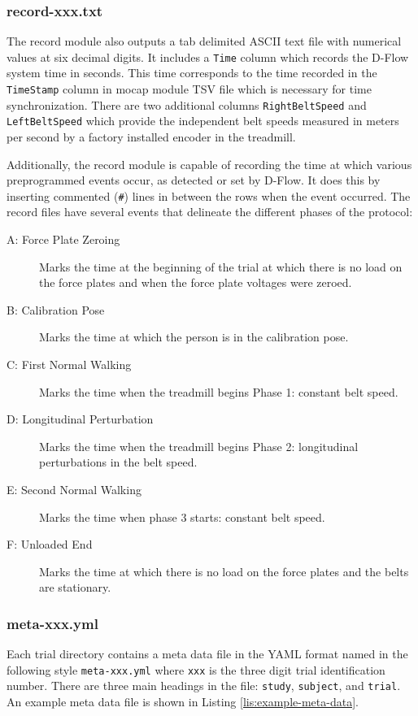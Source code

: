 \documentclass[fleqn,12pt]{wlpeerj}
\begin{document}
\subsubsection*{record-xxx.txt}
%
The record module also outputs a tab delimited ASCII text file with numerical
values at six decimal digits. It includes a \verb+Time+ column which records
the D-Flow system time in seconds. This time corresponds to the time recorded
in the \verb+TimeStamp+ column in mocap module TSV file which is necessary for
time synchronization. There are two additional columns \verb+RightBeltSpeed+
and \verb+LeftBeltSpeed+ which provide the independent belt speeds measured in
meters per second by a factory installed encoder in the treadmill.

Additionally, the record module is capable of recording the time at which
various preprogrammed events occur, as detected or set by D-Flow. It does this
by inserting commented (\verb|#|) lines in between the rows when the event
occurred. The record files have several events that delineate the different
phases of the protocol:
%
\begin{description}
  \item[A: Force Plate Zeroing] Marks the time at the beginning of the trial at
    which there is no load on the force plates and when the force plate
    voltages were zeroed.
  \item[B: Calibration Pose] Marks the time at which the person is in the
    calibration pose.
  \item[C: First Normal Walking] Marks the time when the treadmill begins Phase
    1: constant belt speed.
  \item[D: Longitudinal Perturbation] Marks the time when the treadmill begins
    Phase 2: longitudinal perturbations in the belt speed.
  \item[E: Second Normal Walking] Marks the time when phase 3 starts: constant
    belt speed.
  \item[F: Unloaded End] Marks the time at which there is no load on the force
    plates and the belts are stationary.
\end{description}

\subsubsection*{meta-xxx.yml}

Each trial directory contains a meta data file in the YAML format named in the
following style \verb|meta-xxx.yml| where \verb|xxx| is the three digit trial
identification number. There are three main headings in the file: \verb+study+,
\verb+subject+, and \verb+trial+. An example meta data file is shown in Listing
\ref{lis:example-meta-data}.
\end{document}
